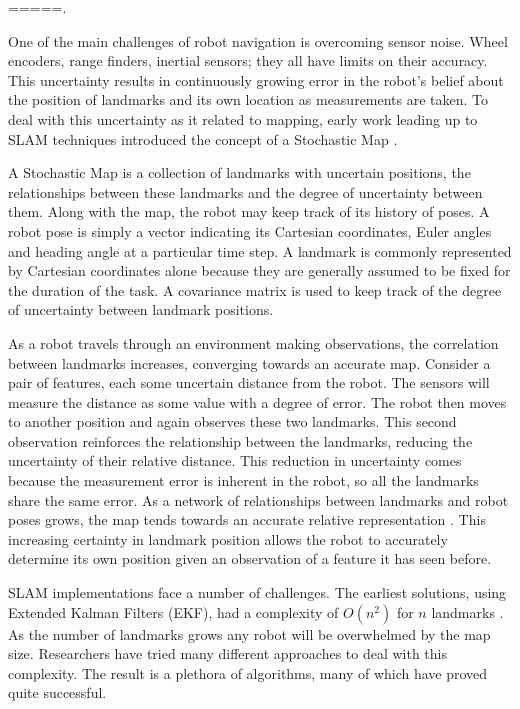 =====.

One of the main challenges of robot navigation is overcoming sensor noise.  Wheel encoders, range finders, inertial sensors; they all have limits on their accuracy.  This uncertainty results in continuously growing error in the robot's belief about the position of landmarks and its own location as measurements are taken.  To deal with this uncertainty as it related to mapping, early work leading up to SLAM techniques introduced the concept of a Stochastic Map \cite{cheeseman1987stochastic}.  

A Stochastic Map is a collection of landmarks with uncertain positions, the relationships between these landmarks and the degree of uncertainty between them.  Along with the map, the robot may keep track of its history of poses.  A robot pose is simply a vector indicating its Cartesian coordinates, Euler angles and heading angle at a particular time step.  A landmark is commonly represented by Cartesian coordinates alone because they are generally assumed to be fixed for the duration of the task.  A covariance matrix is used to keep track of the degree of uncertainty between landmark positions.

As a robot travels through an environment making observations, the correlation between landmarks increases, converging towards an accurate map.  Consider a pair of features, each some uncertain distance from the robot.  The sensors will measure the distance as some value with a degree of error.  The robot then moves to another position and again observes these two landmarks.  This second observation reinforces the relationship between the landmarks, reducing the uncertainty of their relative distance.  This reduction in uncertainty comes because the measurement error is inherent in the robot, so all the landmarks share the same error.  As a network of relationships between landmarks and robot poses grows, the map tends towards an accurate relative representation \cite{durrant2006simultaneous}.  This increasing certainty in landmark position allows the robot to accurately determine its own position given an observation of a feature it has seen before.

SLAM implementations face a number of challenges.  The earliest solutions, using Extended Kalman Filters (EKF), had a complexity of $O(n^2)$ for $n$ landmarks \cite{ThrunPR2005}.  As the number of landmarks grows any robot will be overwhelmed by the map size.  Researchers have tried many different approaches to deal with this complexity.  The result is a plethora of algorithms, many of which have proved quite successful.  

